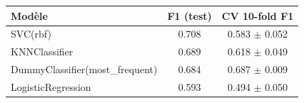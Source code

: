 \begin{tabular}{lcc}
\toprule
Modèle & F1 (test) & CV 10-fold F1 \\
\midrule
SVC(rbf) & 0.708 & 0.583 $\pm$ 0.052 \\
KNNClassifier & 0.689 & 0.618 $\pm$ 0.049 \\
DummyClassifier(most\_frequent) & 0.684 & 0.687 $\pm$ 0.009 \\
LogisticRegression & 0.593 & 0.494 $\pm$ 0.050 \\
\bottomrule
\end{tabular}